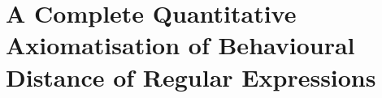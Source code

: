 \chapter{A Complete Quantitative Axiomatisation of Behavioural Distance of Regular Expressions}
\label{chapter2}


